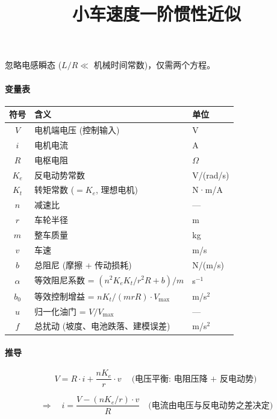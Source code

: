 \documentclass[11pt,a4paper]{article}
\title{小车速度一阶惯性近似}
\author{}
\date{}
\begin{document}
\maketitle

忽略电感瞬态 ($L/R \ll$ 机械时间常数)，仅需两个方程。

\paragraph{变量表}

\begin{center}
\begin{tabular}{c|l|l}
\toprule
符号 & 含义 & 单位 \\
\midrule
$V$   & 电机端电压 (控制输入) & V \\
$i$   & 电机电流 & A \\
$R$   & 电枢电阻 & $\Omega$ \\
$K_e$ & 反电动势常数 & V/(rad/s) \\
$K_t$ & 转矩常数 ($=K_e$, 理想电机) & N·m/A \\
$n$   & 减速比 & --- \\
$r$   & 车轮半径 & m \\
$m$   & 整车质量 & kg \\
$v$   & 车速 & m/s \\
$b$   & 总阻尼 (摩擦 + 传动损耗) & N/(m/s) \\
\midrule
$\alpha$ & 等效阻尼系数 = $(n^2K_eK_t/r^2R + b)/m$ & s$^{-1}$ \\
$b_0$   & 等效控制增益 = $nK_t/(mrR)\cdot V_{\max}$ & m/s$^2$ \\
$u$     & 归一化油门 = $V/V_{\max}$ & --- \\
$f$     & 总扰动 (坡度、电池跌落、建模误差) & m/s$^2$ \\
\bottomrule
\end{tabular}
\end{center}

\paragraph{推导}

\begin{equation}
V = R \cdot i + \frac{nK_e}{r} \cdot v \quad\text{(电压平衡: 电阻压降 $+$ 反电动势)}
\end{equation}

\begin{equation}
\Rightarrow \quad i = \frac{V - (nK_e/r) \cdot v}{R} \quad\text{(电流由电压与反电动势之差决定)}
\end{equation}
\end{document}
